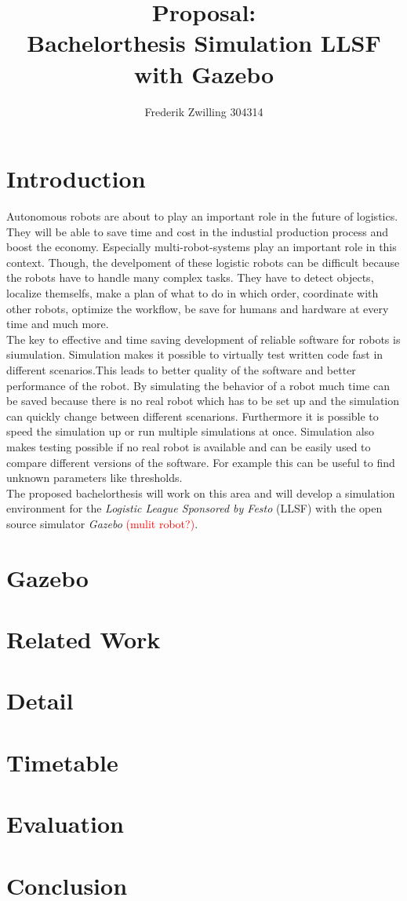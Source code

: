 \documentclass[11pt,a4paper,titlepage]{article}
\author{Frederik Zwilling 304314}
\title{Proposal:\\ Bachelorthesis Simulation LLSF with Gazebo}
\begin{document}
\maketitle
\thispagestyle{empty}
\tableofcontents
\newpage
\onehalfspace

\section{Introduction}
Autonomous robots are about to play an important role in the future of logistics. They will be able to save time and cost in the industial production process and boost the economy. Especially multi-robot-systems play an important role in this context. Though, the develpoment of these logistic robots can be difficult because the robots have to handle many complex tasks. They have to detect objects, localize themselfs, make a plan of what to do in which order, coordinate with other robots, optimize the workflow, be save for humans and hardware at every time and much more.\\
The key to effective and time saving development of reliable software for robots is siumulation. Simulation makes it possible to virtually test written code fast in different scenarios.This leads to better quality of the software and better performance of the robot. By simulating the behavior of a robot much time can be saved because there is no real robot which has to be set up and the simulation can quickly change between different scenarions. Furthermore it is possible to speed the simulation up or run multiple simulations at once. Simulation also makes testing possible if no real robot is available and can be easily used to compare different versions of the software. For example this can be useful to find unknown parameters like thresholds.\\
The proposed bachelorthesis will work on this area and will develop a simulation environment for the \textit{Logistic League Sponsored by Festo} (LLSF) with the open source simulator \textit{Gazebo} \textcolor{red}{(mulit robot?)}.


\section{Gazebo}
\section{Related Work}
\section{Detail}
\section{Timetable}
\section{Evaluation}
\section{Conclusion}
\end{document}
